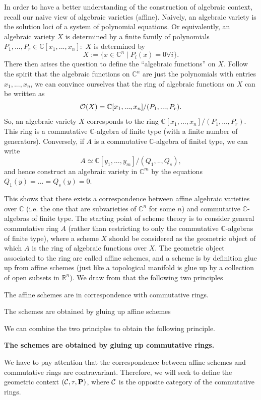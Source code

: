 \documentclass{tufte-book} %
\numberwithin{dummy}{section}
\newcommand{\reals}{\mathbb R}
\newcommand{\cplx}{\mathbb C}
\newcommand{\calc}{{\cal C}}
\newcommand{\calo}{{\cal O}}
\newcommand{\bfp}{\mathbf{P}}
\begin{document}
In order to have a better understanding of the construction of algebraic context, recall our naive view of algebraic varieties (affine). Naively, an algebraic variety is the solution loci of a system of polynomial equations. Or equivalently, an algebraic variety $X$ is determined by a finite family of polynomials $P_1,...,P_r\in \cplx[x_1,...,x_n]:$ $X$ is determined by
$$
X:=\{x\in\cplx^n\mid P_i(x)=0\forall i\}.
$$ 
There then arises the question to define the ``algebraic functions'' on $X$. Follow the spirit that the algebraic functions on $\cplx^n$ are just the polynomials with entries $x_1,...,x_n$, we can convince ourselves that the ring of algebraic functions on  $X$ can be written as
$$
\calo(X)=\cplx[x_1,...,x_n]/(P_1,...,P_r).
$$  
So, an algebraic variety $X$ corresponds to the ring $\cplx[x_1,...,x_n]/(P_1,...,P_r)$. This ring is a commutative $\cplx$-algebra of finite type (with a finite number of generators). Conversely, if $A$ is a commutative $\cplx$-algebra  of finitel type, we can write
$$
A\simeq \cplx[y_1,...,y_m]/(Q_1,..,Q_s),
$$
and hence construct an algebraic variety in $\cplx^m$ by the equations $Q_1(y)=...=Q_s(y)=0$.

This shows that there exists a correspondence between affine algebraic varieties over $\cplx$ (i.e. the one that are subvarieties of $\cplx^n$ for some $n$) and commutative $\cplx$-algebras of finite type. The starting point of scheme theory is to consider general commutative ring $A$ (rather than restricting to only the commutative $\cplx$-algebras of finite type), where a scheme $X$ should be considered as the geometric object of which $A$ is the ring of algebraic functions over $X$. The geometric object associated to the ring are called affine schemes, and a scheme is by definition glue up from affine schemes (just like a topological manifold is glue up by  a collection of open subsets in $\reals^n$). We draw from that the following two principles

\textsf{The affine schemes are in correspondence with commutative rings.}

\textsf{The schemes are obtained by gluing up affine schemes}

We can combine the two principles to obtain the following principle.

\textbf{The schemes are obtained by gluing up commutative rings.}

We have to pay attention that the correspondence between affine schemes and commutative rings are contravariant. Therefore, we will seek to define the geometric context $(\calc,\tau,\bfp)$, where $\calc$ is the opposite category of the commutative rings.
\end{document}
